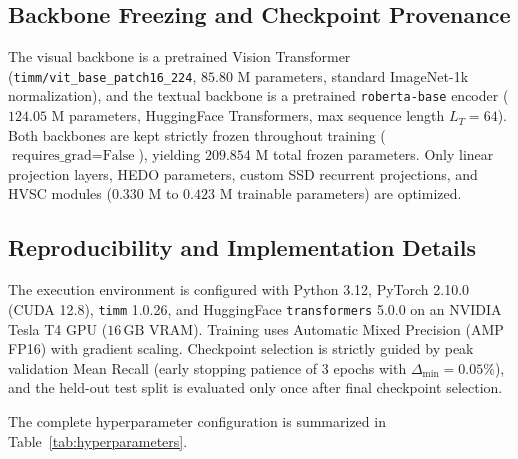 \documentclass[journal]{IEEEtran}
\begin{document}
\subsection{Backbone Freezing and Checkpoint Provenance}
The visual backbone is a pretrained Vision Transformer (\texttt{timm/vit\_base\_patch16\_224}, $85.80\text{ M}$ parameters, standard ImageNet-1k normalization), and the textual backbone is a pretrained \texttt{roberta-base} encoder ($124.05\text{ M}$ parameters, HuggingFace Transformers, max sequence length $L_T=64$). Both backbones are kept strictly frozen throughout training ($\text{requires\_grad} = \text{False}$), yielding $209.854\text{ M}$ total frozen parameters. Only linear projection layers, HEDO parameters, custom SSD recurrent projections, and HVSC modules ($0.330\text{ M}$ to $0.423\text{ M}$ trainable parameters) are optimized.

\subsection{Reproducibility and Implementation Details}
The execution environment is configured with Python 3.12, PyTorch 2.10.0 (CUDA 12.8), \texttt{timm} 1.0.26, and HuggingFace \texttt{transformers} 5.0.0 on an NVIDIA Tesla T4 GPU ($16\,\text{GB}$ VRAM). Training uses Automatic Mixed Precision (AMP FP16) with gradient scaling. Checkpoint selection is strictly guided by peak validation Mean Recall (early stopping patience of 3 epochs with $\Delta_{\text{min}}=0.05\%$), and the held-out test split is evaluated only once after final checkpoint selection.

The complete hyperparameter configuration is summarized in Table~\ref{tab:hyperparameters}.
\end{document}
